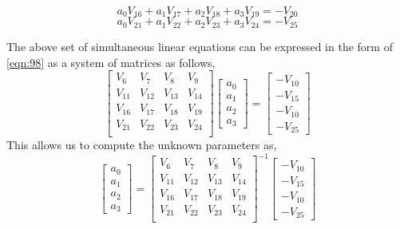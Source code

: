 \documentclass[letterpaper%
, twoside%
, 12pt%
,memoire%
, english%
,creativecommons,hyperref%
]{thETS}
\theoremstyle{newThmStyle}
\begin{document}
\begin{equation}\label{eqn.129}
a_{0} V_{16} + a_{1}V_{17} + a_{2}V_{18} + a_{3}V_{19} = -V_{20}
\end{equation}
\begin{equation}\label{eqn.129.5}
a_{0} V_{21} + a_{1}V_{22} + a_{2}V_{23} + a_{3}V_{24} = -V_{25}
\end{equation}
\par The above set of simultaneous linear equations can be expressed in the form of \eqref{eqn:98} as a system of matrices as follows,
\begin{equation}\label{eqn.130}
\begin{bmatrix}
	V_{6}&V_{7}&V_{8}&V_{9}\\
	V_{11}&V_{12}&V_{13}&V_{14}\\
	V_{16}&V_{17}&V_{18}&V_{19}\\
	V_{21}&V_{22}&V_{23}&V_{24}\\
\end{bmatrix}
\begin{bmatrix}
	a_{0}\\
	a_{1}\\
	a_{2}\\
	a_{3}
\end{bmatrix}
=\begin{bmatrix}
	-V_{10}\\
	-V_{15}\\
	-V_{10}\\
	-V_{25}
\end{bmatrix}
\end{equation}
This allows us to compute the unknown parameters as,
\begin{equation}\label{eqn.131}
\begin{bmatrix}
	a_{0}\\
	a_{1}\\
	a_{2}\\
	a_{3}
\end{bmatrix}
={\begin{bmatrix}
	V_{6}&V_{7}&V_{8}&V_{9}\\
	V_{11}&V_{12}&V_{13}&V_{14}\\
	V_{16}&V_{17}&V_{18}&V_{19}\\
	V_{21}&V_{22}&V_{23}&V_{24}\\
\end{bmatrix}}^{-1}
\begin{bmatrix}
	-V_{10}\\
	-V_{15}\\
	-V_{10}\\
	-V_{25}
\end{bmatrix}
\end{equation}
\end{document}
